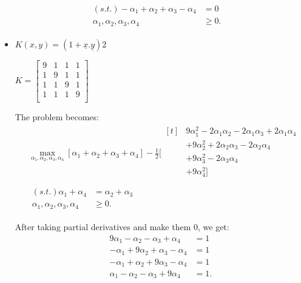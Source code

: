 \documentclass[letter, 12pt]{article}
\begin{document}
\begin{enumerate}
\begin{align*}
    	&
    	\begin{aligned}
    	(s.t.) -\alpha_1 + \alpha_2 + \alpha_3 -\alpha_4 &= 0 \\
    	\alpha_1, \alpha_2, \alpha_3, \alpha_4 &\ge 0.
    	\end{aligned}
    	\end{align*}
    	\begin{itemize}
    		\item{$ K(x, y) = (1 + \underline{x}.\underline{y}) 2 $}
    		\par{}
    		$ K = \begin{bmatrix}
    		9 & 1 & 1 & 1 \\
    		1 & 9 & 1 & 1 \\
    		1 & 1 & 9 & 1 \\
    		1 & 1 & 1 & 9 \\
    		\end{bmatrix} $
    		\par{The problem becomes:}
    		\begin{align*}
    		&\max_{\alpha_1, \alpha_2, \alpha_3, \alpha_4} [\alpha_1 + \alpha_2 + \alpha_3 + \alpha_4] - \frac{1}{2} [
    		\begin{aligned}[t]
    		&9 \alpha_1^2 - 2\alpha_1 \alpha_2 - 2\alpha_1 \alpha_3 + 2\alpha_1 \alpha_4 \\
    		& + 9 \alpha_2^2 + 2\alpha_2 \alpha_3 - 2\alpha_2 \alpha_4 \\
    		& + 9 \alpha_3^2 - 2\alpha_3 \alpha_4 \\
    		& + 9 \alpha_4^2 ] \\
    		\end{aligned} \\
    		&
    		\begin{aligned}
    		(s.t.) \alpha_1 + \alpha_4 &= \alpha_2 + \alpha_3 \\
    		\alpha_1, \alpha_2, \alpha_3, \alpha_4 &\ge 0.
    		\end{aligned}
    		\end{align*}
    		\par{After taking partial derivatives and make them 0, we get:}
    		\begin{align*}
    			9 \alpha_1 - \alpha_2 - \alpha_3 + \alpha_4 &= 1 \\
    			-\alpha_1 + 9 \alpha_2 + \alpha_3 - \alpha_4 &= 1 \\
    			- \alpha_1 + \alpha_2 + 9 \alpha_3 - \alpha_4 &= 1 \\
    			\alpha_1 - \alpha_2 - \alpha_3 + 9 \alpha_4 &= 1 .

\end{align*}
\end{itemize}
\end{enumerate}
\end{document}
